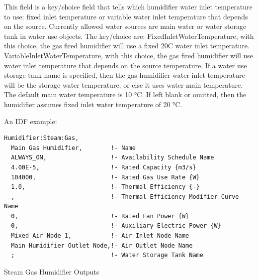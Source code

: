 This field is a key/choice field that tells which humidifier water inlet temperature to use: fixed inlet temperature or variable water inlet temperature that depends on the source. Currently allowed water sources are main water or water storage tank in water use objects. The key/choice are: FixedInletWaterTemperature, with this choice, the gas fired humidifier will use a fixed 20C water inlet temperature. VariableInletWaterTemperature, with this choice, the gas fired humidifier will use water inlet temperature that depends on the source temperature. If a water use storage tank name is specified, then the gas humidifier water inlet temperature will be the storage water temperature, or else it uses water main temperature. The default main water temperature is 10 °C. If left blank or omitted, then the humidifier assumes fixed inlet water temperature of 20 °C.

An IDF example:

\begin{lstlisting}
Humidifier:Steam:Gas,
  Main Gas Humidifier,        !- Name
  ALWAYS_ON,                  !- Availability Schedule Name
  4.00E-5,                    !- Rated Capacity {m3/s}
  104000,                     !- Rated Gas Use Rate {W}
  1.0,                        !- Thermal Efficiency {-}
  ,                           !- Thermal Efficiency Modifier Curve Name
  0,                          !- Rated Fan Power {W}
  0,                          !- Auxiliary Electric Power {W}
  Mixed Air Node 1,           !- Air Inlet Node Name
  Main Humidifier Outlet Node,!- Air Outlet Node Name
  ;                           !- Water Storage Tank Name
\end{lstlisting}

Steam Gas Humidifier Outputs


